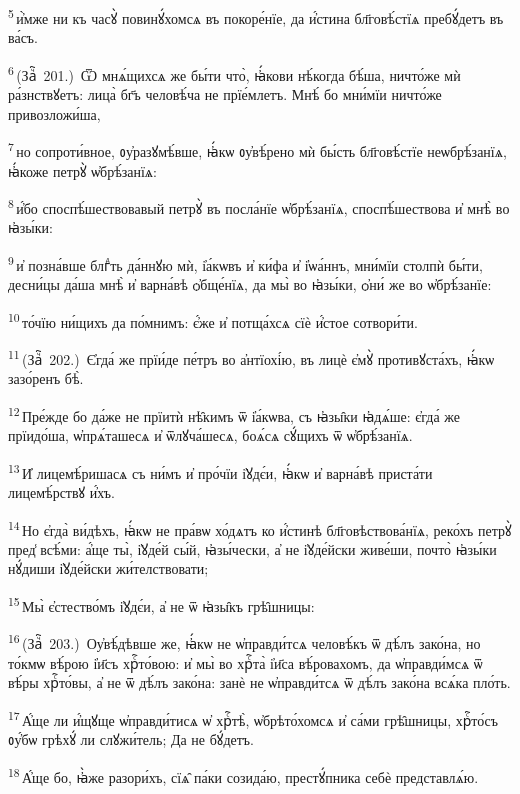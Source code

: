 \textsuperscript{5}\,и҆̀мже ни къ часꙋ̀ повинꙋ́хомсѧ въ покоре́нїе, да и҆́стина бл҃говѣ́стїѧ пребꙋ́детъ въ ва́съ.

\textsuperscript{6}\,(Заⷱ҇~201.)~Ѿ мнѧ́щихсѧ же бы́ти что̀, ꙗ҆́кови нѣ́когда бѣ́ша, ничто́же мѝ ра́знствꙋетъ: лица̀ бг҃ъ человѣ́ча не прїе́млетъ. Мнѣ́ бо мни́мїи ничто́же привозложи́ша,

\textsuperscript{7}\,но сопроти́вное, ᲂу҆разꙋмѣ́вше, ꙗ҆́кѡ ᲂу҆вѣ́рено мѝ бы́сть бл҃говѣ́стїе неѡбрѣ́занїѧ, ꙗ҆́коже петрꙋ̀ ѡ҆брѣ́занїѧ:

\textsuperscript{8}\,и҆́бо споспѣ́шествовавый петрꙋ̀ въ посла́нїе ѡ҆брѣ́занїѧ, споспѣ́шествова и҆ мнѣ̀ во ꙗ҆зы́ки:

\textsuperscript{9}\,и҆ позна́вше блгⷣть да́ннꙋю мѝ, і҆а́кѡвъ и҆ ки́фа и҆ і҆ѡа́ннъ, мни́мїи столпѝ бы́ти, десни́цы да́ша мнѣ̀ и҆ варна́вѣ ѻ҆бще́нїѧ, да мы̀ во ꙗ҆зы́ки, ѻ҆ни́ же во ѡ҆брѣ́занїе:

\textsuperscript{10}\,то́чїю ни́щихъ да по́мнимъ: є҆́же и҆ потща́хсѧ сїѐ и҆́стое сотвори́ти.

\textsuperscript{11}\,(Заⷱ҇~202.)~Є҆гда́ же прїи́де пе́тръ во а҆нтїохі́ю, въ лицѐ є҆мꙋ̀ противꙋста́хъ, ꙗ҆́кѡ зазо́ренъ бѣ̀.

\textsuperscript{12}\,Пре́жде бо да́же не прїитѝ нѣ̑кимъ ѿ і҆а́кѡва, съ ꙗ҆зы̑ки ꙗ҆дѧ́ше: є҆гда́ же прїидо́ша, ѡ҆прѧ́ташесѧ и҆ ѿлꙋча́шесѧ, боѧ́сѧ сꙋ́щихъ ѿ ѡ҆брѣ́занїѧ.

\textsuperscript{13}\,И҆ лицемѣ́ришасѧ съ ни́мъ и҆ про́чїи і҆ꙋдє́и, ꙗ҆́кѡ и҆ варна́вѣ приста́ти лицемѣ́рствꙋ и҆́хъ.

\textsuperscript{14}\,Но є҆гда̀ ви́дѣхъ, ꙗ҆́кѡ не пра́вѡ хо́дѧтъ ко и҆́стинѣ бл҃говѣствова́нїѧ, реко́хъ петрꙋ̀ пред̾ всѣ́ми: а҆́ще ты̀, і҆ꙋде́й сы́й, ꙗ҆зы́чески, а҆ не і҆ꙋде́йски живе́ши, почто̀ ꙗ҆зы́ки нꙋ́диши і҆ꙋде́йски жи́телствовати;

\textsuperscript{15}\,Мы̀ є҆стество́мъ і҆ꙋдє́и, а҆ не ѿ ꙗ҆зы̑къ грѣ̑шницы:

\textsuperscript{16}\,(Заⷱ҇~203.)~Оу҆вѣ́дѣвше же, ꙗ҆́кѡ не ѡ҆правди́тсѧ человѣ́къ ѿ дѣ́лъ зако́на, но то́кмѡ вѣ́рою і҆и҃съ хрⷭ҇то́вою: и҆ мы̀ во хрⷭ҇та̀ і҆и҃са вѣ́ровахомъ, да ѡ҆правди́мсѧ ѿ вѣ́ры хрⷭ҇то́вы, а҆ не ѿ дѣ́лъ зако́на: занѐ не ѡ҆правди́тсѧ ѿ дѣ́лъ зако́на всѧ́ка пло́ть.

\textsuperscript{17}\,А҆́ще ли и҆́щꙋще ѡ҆правди́тисѧ ѡ҆ хрⷭ҇тѣ̀, ѡ҆брѣто́хомсѧ и҆ са́ми грѣ̑шницы, хрⷭ҇то́съ ᲂу҆́бѡ грѣхꙋ́ ли слꙋжи́тель; Да не бꙋ́детъ.

\textsuperscript{18}\,А҆́ще бо, ꙗ҆̀же разори́хъ, сїѧ̑ па́ки созида́ю, престꙋ́пника себѐ представлѧ́ю.

